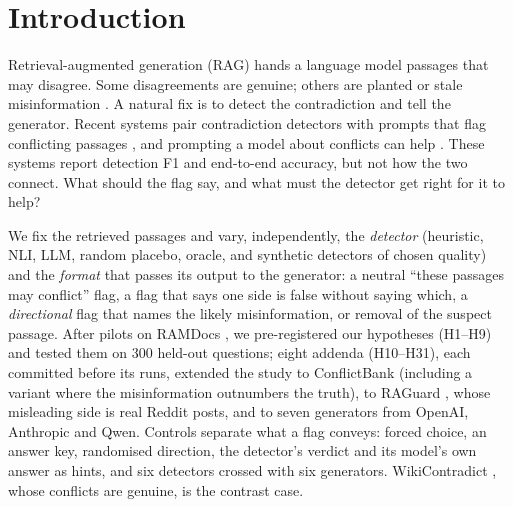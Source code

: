 \section{Introduction}

Retrieval-augmented generation (RAG) \citep{lewis2020rag} hands a language model passages that may disagree. Some
disagreements are genuine; others are planted or stale misinformation \citep{zou2025poisonedrag,wang2025madam}. A natural fix is to detect the contradiction and tell
the generator. Recent systems pair contradiction detectors with prompts that flag conflicting passages
\citep{wang2026conflictrag}, and prompting a model about conflicts can help \citep{cattan2025conflicts}. These systems
report detection F1 and end-to-end accuracy, but not how the two connect. What should the flag say, and what must the
detector get right for it to help?

We fix the retrieved passages and vary, independently, the \emph{detector} (heuristic, NLI, LLM, random placebo,
oracle, and synthetic detectors of chosen quality) and the \emph{format} that passes its output to the generator: a
neutral ``these passages may conflict'' flag, a flag that says one side is false without saying which, a
\emph{directional} flag that names the likely misinformation, or removal of the suspect passage. After pilots on
RAMDocs \citep{wang2025madam}, we pre-registered our hypotheses (H1--H9) and tested them on 300 held-out questions;
eight addenda (H10--H31), each committed before its runs, extended the study to ConflictBank \citep{su2024conflictbank}
(including a variant where the misinformation outnumbers the truth), to RAGuard \citep{zeng2025raguard}, whose
misleading side is real Reddit posts, and to seven generators from OpenAI, Anthropic and Qwen. Controls separate what a
flag conveys: forced choice, an answer key, randomised direction, the detector's verdict and its model's own answer as
hints, and six detectors crossed with six generators. WikiContradict \citep{hou2024wikicontradict}, whose conflicts are genuine, is the contrast case.

